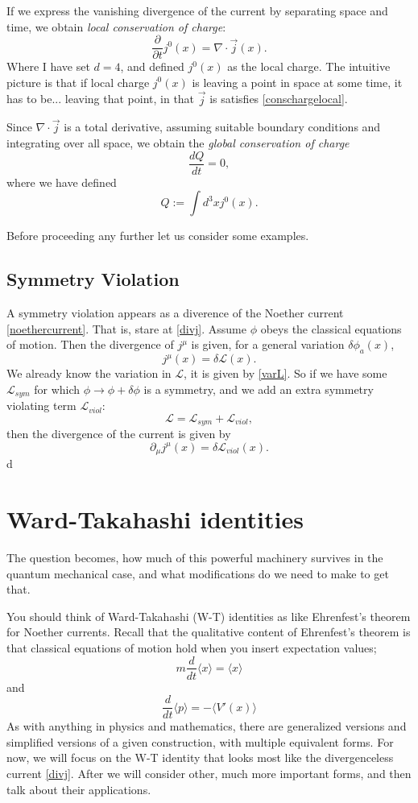 \documentclass[main.tex]{subfiles}
\begin{document}
If we express the vanishing divergence of the current by separating space and time, we obtain \textit{local conservation of charge}:
\begin{equation} \label{conschargelocal}
\frac{\partial}{\partial t} j^0 (x) = \nabla \cdot \vec{j} (x).
\end{equation}
Where I have set $d = 4$, and defined $j^0 (x)$ as the local charge. The intuitive picture is that if local charge $j^0 (x)$ is leaving a point in space at some time, it has to be... leaving that point, in that $\vec{j}$ is satisfies \ref{conschargelocal}. 

Since $\nabla \cdot \vec{j}$ is a total derivative, assuming suitable boundary conditions and integrating over all space, we obtain the \textit{global conservation of charge}
\[
\frac{d Q }{dt} = 0,
\]
where we have defined
\[
Q := \int d^3 x j^0 (x).
\]

Before proceeding any further let us consider some examples.

\subsection{Symmetry Violation}
A symmetry violation appears as a diverence of the Noether current \ref{noethercurrent}. That is, stare at \ref{divj}. Assume $\phi$ obeys the classical equations of motion. Then the divergence of $j^\mu$ is given, for a general variation $\delta \phi_a (x)$,
\begin{equation} \label{varj}
j^\mu (x) = \delta \mathcal{L} (x).
\end{equation}
We already know the variation in $\mathcal{L}$, it is given by \ref{varL}. So if we have some $\mathcal{L}_{sym}$ for which $\phi \to \phi + \delta \phi$ is a symmetry, and we add an extra symmetry violating term $\mathcal{L}_{viol}$:
\[
\mathcal{L} = \mathcal{L}_{sym} + \mathcal{L}_{viol},
\]
then the divergence of the current is given by 
\[
\partial_\mu j^\mu (x) = \delta \mathcal{L}_{viol} (x).
\]
d
\section{Ward-Takahashi identities}
The question becomes, how much of this powerful machinery survives in the quantum mechanical case, and what modifications do we need to make to get that.

You should think of Ward-Takahashi (W-T) identities as like Ehrenfest's theorem for Noether currents. Recall that the qualitative content of Ehrenfest's theorem is that classical equations of motion hold when you insert expectation values;
\[
m\frac{d}{dt} \langle x \rangle = \langle x \rangle
\]
and
\[
\frac{d}{dt} \langle p \rangle = - \langle V'(x) \rangle
\]
As with anything in physics and mathematics, there are generalized versions and simplified versions of a given construction, with multiple equivalent forms. For now, we will focus on the W-T identity that looks most like the divergenceless current \ref{divj}. After we will consider other, much more important forms, and then talk about their applications. 
\end{document}
